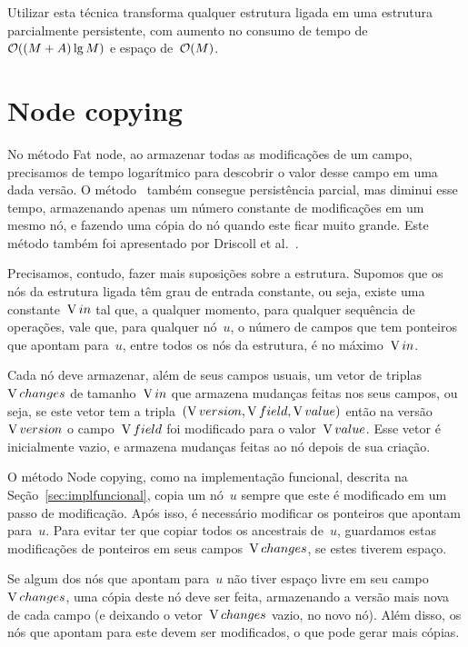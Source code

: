 \documentclass[main.tex]{subfiles}
\begin{document}
Utilizar esta técnica transforma qualquer estrutura ligada em uma estrutura parcialmente persistente, com aumento no consumo de tempo de~$\mathcal{O}((M+A) \lg{M})$ e espaço de~$\mathcal{O}(M)$.

\section{Node copying} \label{sec:nodecopying}

No método Fat node, ao armazenar todas as modificações de um campo, precisamos de tempo logarítmico para descobrir o valor desse campo em uma dada versão. O método~ também consegue persistência parcial, mas diminui esse tempo, armazenando apenas um número constante de modificações em um mesmo nó, e fazendo uma cópia do nó quando este ficar muito grande. Este método também foi apresentado por Driscoll et al.~\cite{DriscollSST1989}.

Precisamos, contudo, fazer mais suposições sobre a estrutura. Supomos que os nós da estrutura ligada têm grau de entrada constante, ou seja, existe uma constante~$\operatorname{V}{in}$ tal que, a qualquer momento, para qualquer sequência de operações, vale que, para qualquer nó~$u$, o número de campos que tem ponteiros que apontam para~$u$, entre todos os nós da estrutura, é no máximo~$\operatorname{V}{in}$.

\newcommand{\changes}{\V{changes}}
\newcommand{\parents}{\V{parents}}
\newcommand{\ts}{\mathcal{T}}
\newcommand{\cp}{\V{copy}}
\newcommand{\version}{\V{version}}
\newcommand{\entry}{\V{entry}}

Cada nó deve armazenar, além de seus campos usuais, um vetor de triplas~$\operatorname{V}{changes}$ de tamanho~$\operatorname{V}{in}$ que armazena mudanças feitas nos seus campos, ou seja, se este vetor tem a tripla~${(\operatorname{V}{version}, \operatorname{V}{field}, \operatorname{V}{value})}$ então na versão~$\operatorname{V}{version}$ o campo~$\operatorname{V}{field}$ foi modificado para o valor~$\operatorname{V}{value}$. Esse vetor é inicialmente vazio, e armazena mudanças feitas ao nó depois de sua criação.

O método Node copying, como na implementação funcional, descrita na Seção~\ref{sec:implfuncional}, copia um nó~$u$ sempre que este é modificado em um passo de modificação. Após isso, é necessário modificar os ponteiros que apontam para~$u$. Para evitar ter que copiar todos os ancestrais de~$u$, guardamos estas modificações de ponteiros em seus campos~$\changes$, se estes tiverem espaço.

Se algum dos nós que apontam para~$u$ não tiver espaço livre em seu campo~$\changes$, uma cópia deste nó deve ser feita, armazenando a versão mais nova de cada campo (e deixando o vetor~$\changes$ vazio, no novo nó). Além disso, os nós que apontam para este devem ser modificados, o que pode gerar mais cópias.
\end{document}
